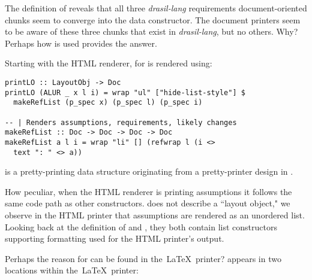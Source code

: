 The definition of  reveals that all three \textit{drasil-lang} requirements \linebreak document-oriented chunks seem to converge into the data constructor. The document printers seem to be aware of these three chunks that exist in \textit{drasil-lang}, but no others. Why? Perhaps how  is used provides the answer.

Starting with the HTML renderer,  for  is rendered using:

\begin{tcolorbox}
\begin{verbatim}
printLO :: LayoutObj -> Doc
printLO (ALUR _ x l i) = wrap "ul" ["hide-list-style"] $
  makeRefList (p_spec x) (p_spec l) (p_spec i)

-- | Renders assumptions, requirements, likely changes
makeRefList :: Doc -> Doc -> Doc -> Doc
makeRefList a l i = wrap "li" [] (refwrap l (i <>
  text ": " <> a))
\end{verbatim}
\end{tcolorbox}

 is a pretty-printing data structure originating from a pretty-printer design in \cite{Hughes95thedesign}.

How peculiar, when the HTML renderer is printing assumptions it follows the same code path as other  constructors.  does not describe a ``layout object," we observe in the HTML printer that assumptions are rendered as an unordered list. Looking back at the definition of  and , they both contain list constructors supporting formatting used for the HTML printer's  output. 

%
%
%

Perhaps the reason for  can be found in the\ \LaTeX\ printer?  appears in two locations within the\ \LaTeX\ printer:

